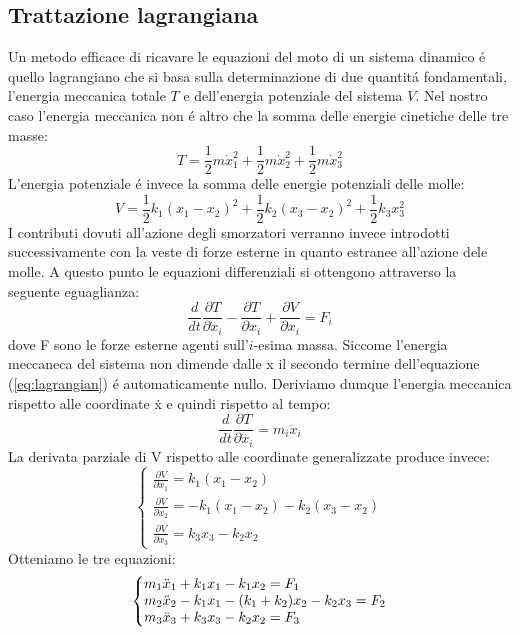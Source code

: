 \documentclass[12pt,a4paper]{article}
\makeatletter
\newenvironment{sistema}%
  {\left\lbrace\begin{array}{@{}l@{}}}%
  {\end{array}\right.}
\makeatother
\begin{document}
 	\subsection[Lagrangiana]{Trattazione lagrangiana}
 		Un metodo efficace di ricavare le equazioni del moto di un sistema dinamico \'e quello lagrangiano che si basa sulla determinazione di due quantit\'a fondamentali, l'energia meccanica totale $T$ e dell'energia potenziale del sistema $V$. Nel nostro caso l'energia meccanica non \'e altro che la somma delle energie cinetiche delle tre masse:
 		\begin{equation}
 			T= \frac{1}{2} m \dot x_1^2 +\frac{1}{2} m \dot x_2^2+ \frac{1}{2}m \dot x_3^2 
 			\label{eq:mechanical-energy}
 		\end{equation}
 		L'energia potenziale \'e invece la somma delle energie potenziali delle molle:
 		\begin{equation}
 			V= \frac{1}{2} k_1(x_1-x_2)^2+\frac{1}{2} k_2(x_3-x_2)^2 + \frac{1}{2} k_3 x_3^2
 			\label{eq:potential-energy}
 		\end{equation}
 		I contributi dovuti all'azione degli smorzatori verranno invece introdotti successivamente con la veste di forze esterne in quanto estranee all'azione dele molle.
 		A questo punto le equazioni differenziali si ottengono attraverso la seguente eguaglianza: 		
 		\begin{equation}
 			\frac{d}{dt} \frac{\partial T}{\partial \dot x_i} - \frac{\partial T}{\partial x_i} + \frac{\partial V}{\partial x_i}=F_i
 			\label{eq:lagrangian}
 		\end{equation}
 		dove F sono le forze esterne agenti sull'$i$-esima massa. Siccome l'energia meccaneca del sistema non dimende dalle x il secondo termine dell'equazione (\ref{eq:lagrangian}) \'e automaticamente nullo. Deriviamo dumque l'energia meccanica rispetto alle coordinate \.x e quindi rispetto al tempo:
 		\begin{equation}
 			\frac{d}{dt} \frac{\partial T}{\partial \dot x_i}= m_i \ddot{x}_i
 			\label{eq:lagrangian-1}
 		\end{equation}
 		La derivata parziale di V rispetto alle coordinate generalizzate produce invece:
 		\[
 		\begin{cases}
 		\frac{\partial V}{\partial x_1}= k_1(x_1 - x_2)
 		\\
 		\frac{\partial V}{\partial x_2} = - k_1(x_1 - x_2) - k_2(x_3 - x_2)
 		\\
 		\frac{\partial V}{\partial x_3} = k_3 x_3-k_2 x_2
 		\end{cases}
 		\]
 		Otteniamo le tre equazioni:
 		\[
 		\begin{sistema}
 			m_1 \ddot{x}_1 + k_1x_1 - k_1 x_2 = F_1
 			\\
 			m_2 \ddot{x}_2 - k_1 x_1 - (k_1 +k_2 )x_2 - k_2 x_3  = F_2
 			\\
 			m_3 \ddot{x}_3 + k_3 x_3 -k_2 x_2= F_3
 			\label{eq:sistema-1}

 		\end{sistema}
 		\]
		
\end{document}
